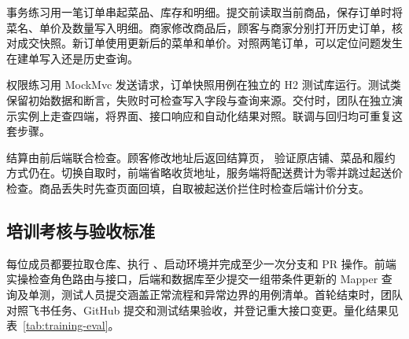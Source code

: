事务练习用一笔订单串起菜品、库存和明细。提交前读取当前商品，保存订单时将菜名、单价及数量写入明细。商家修改商品后，顾客与商家分别打开历史订单，核对成交快照。新订单使用更新后的菜单和单价。对照两笔订单，可以定位问题发生在建单写入还是历史查询。

权限练习用 MockMvc 发送请求，订单快照用例在独立的 H2 测试库运行。测试类保留初始数据和断言，失败时可检查写入字段与查询来源。交付时，团队在独立演示实例上走查四端，将界面、接口响应和自动化结果对照。联调与回归均可重复这套步骤。

结算由前后端联合检查。顾客修改地址后返回结算页， 验证原店铺、菜品和履约方式仍在。切换自取时，前端省略收货地址，服务端将配送费计为零并跳过起送价检查。商品丢失时先查页面回填，自取被起送价拦住时检查后端计价分支。

\subsection{培训考核与验收标准}

每位成员都要拉取仓库、执行 、启动环境并完成至少一次分支和 PR 操作。前端实操检查角色路由与接口，后端和数据库至少提交一组带条件更新的 Mapper 查询及单测，测试人员提交涵盖正常流程和异常边界的用例清单。首轮结束时，团队对照飞书任务、GitHub 提交和测试结果验收，并登记重大接口变更。\mbox{量化结果见表~\ref{tab:training-eval}}。
